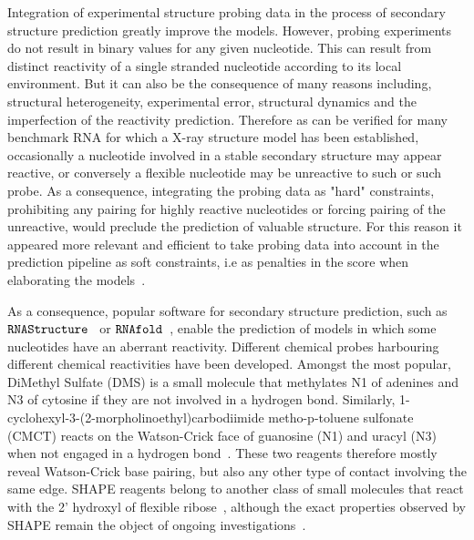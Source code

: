 \documentclass[a4,center,fleqn]{NAR}
\newcommand{\Software}[1]{$\text{\ttfamily #1}$}
\begin{document}
Integration of experimental structure probing data in the process of secondary structure prediction greatly improve the models. However, probing experiments do not result in binary values for any given nucleotide. This can result from distinct reactivity of a single stranded nucleotide according to its local environment. But it can also be the consequence of many reasons including, structural heterogeneity, experimental error, structural dynamics and the imperfection of the reactivity prediction. Therefore as can be verified for many benchmark RNA for which a X-ray structure model has been established, occasionally a nucleotide involved in a stable secondary structure may appear reactive, or conversely a flexible nucleotide may be unreactive to such or such probe. As a consequence, integrating the probing data as "hard" constraints, prohibiting any pairing for highly reactive nucleotides or forcing pairing of the unreactive, would preclude the prediction of valuable structure. For this reason it appeared more relevant and efficient to take probing data into account in the prediction pipeline as soft constraints, i.e as penalties in the score when elaborating the models~\cite{Deigan2009,Washietl2012,Zarringhalam2012}. 
\enlargethispage{-65.1pt}


As a consequence, popular software for secondary structure prediction, such as \Software{RNAStructure}~\cite{Mathews2004} or \Software{RNAfold}~\cite{Lorenz2011}, enable the prediction of models in which some nucleotides have an aberrant reactivity. 
Different chemical probes harbouring different chemical reactivities have been developed. Amongst the most popular, DiMethyl Sulfate (DMS) is a small molecule that methylates N1 of adenines and N3 of cytosine if they are not involved in a hydrogen bond. Similarly, 1-cyclohexyl-3-(2-morpholinoethyl)carbodiimide metho-p-toluene sulfonate (CMCT) reacts on the Watson-Crick face of guanosine (N1) and uracyl (N3) when not engaged in a hydrogen bond~\cite{Ehresmann1987,Brunel2000}. These two reagents therefore mostly reveal Watson-Crick base pairing, but also any other type of contact involving the same edge. SHAPE reagents belong to another class of small molecules that react with the 2’ hydroxyl of flexible ribose~\cite{McGinnis2012}, although the exact properties observed by SHAPE remain the object of ongoing investigations~\cite{Hurst2018,Mlynsky2018}. 
\end{document}
